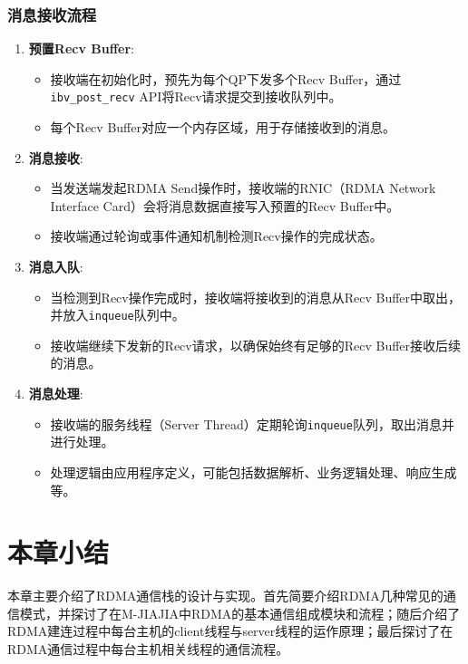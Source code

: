 {    \subsubsection{消息接收流程}
    \begin{enumerate}[leftmargin=1em, align=left]
        \item \textbf{预置Recv Buffer}:
              \begin{itemize}[leftmargin=*, nosep]
                  \item 接收端在初始化时，预先为每个QP下发多个Recv Buffer，通过\texttt{ibv\_post\_recv} API将Recv请求提交到接收队列中。
                  \item 每个Recv Buffer对应一个内存区域，用于存储接收到的消息。
              \end{itemize}
        \item \textbf{消息接收}:
              \begin{itemize}[leftmargin=*, nosep]
                  \item 当发送端发起RDMA Send操作时，接收端的RNIC（RDMA Network Interface Card）会将消息数据直接写入预置的Recv Buffer中。
                  \item 接收端通过轮询或事件通知机制检测Recv操作的完成状态。
              \end{itemize}
        \item \textbf{消息入队}:
              \begin{itemize}[leftmargin=*, nosep]
                  \item 当检测到Recv操作完成时，接收端将接收到的消息从Recv Buffer中取出，并放入\texttt{inqueue}队列中。
                  \item 接收端继续下发新的Recv请求，以确保始终有足够的Recv Buffer接收后续的消息。
              \end{itemize}
        \item \textbf{消息处理}:
              \begin{itemize}[leftmargin=*, nosep]
                  \item 接收端的服务线程（Server Thread）定期轮询\texttt{inqueue}队列，取出消息并进行处理。
                  \item 处理逻辑由应用程序定义，可能包括数据解析、业务逻辑处理、响应生成等。
              \end{itemize}
    \end{enumerate}


    \section{本章小结}本章主要介绍了RDMA通信栈的设计与实现。首先简要介绍RDMA几种常见的通信模式，并探讨了在M-JIAJIA中RDMA的基本通信组成模块和流程；随后介绍了RDMA建连过程中每台主机的client线程与server线程的运作原理；最后探讨了在RDMA通信过程中每台主机相关线程的通信流程。

}
